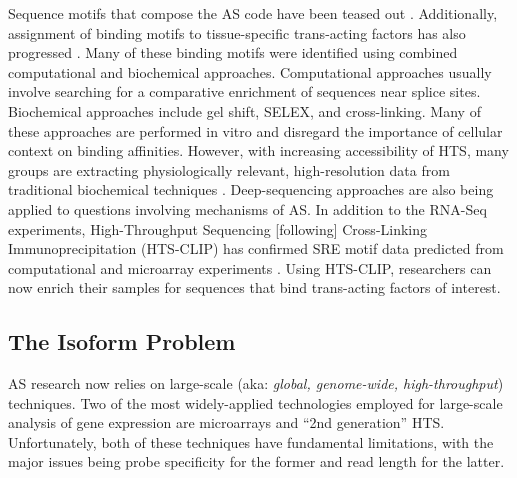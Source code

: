     Sequence motifs that compose the AS code have been teased out \citep{Ladd2002, Barash2010}. Additionally, assignment of binding motifs to tissue-specific trans-acting factors has also progressed \citep{Jin2003,Ule2005,Licatalosi2008}. Many of these binding motifs were identified using combined computational and biochemical approaches. Computational approaches usually involve searching for a comparative enrichment of sequences near splice sites. Biochemical approaches include gel shift, SELEX, and cross-linking. Many of these approaches are performed in vitro and disregard the importance of cellular context on binding affinities. However, with increasing accessibility of HTS, many groups are extracting physiologically relevant, high-resolution data from traditional biochemical techniques \citep{Ingolia2009, Ingolia2011}. Deep-sequencing approaches are also being applied to questions involving mechanisms of AS. In addition to the RNA-Seq experiments, High-Throughput Sequencing [following] Cross-Linking Immunoprecipitation (HTS-CLIP) has confirmed SRE motif data predicted from computational and microarray experiments \citep{Licatalosi2008,Hafner2010}. Using HTS-CLIP, researchers can now enrich their samples for sequences that bind trans-acting factors of interest. 

  \subsection{The Isoform Problem}\label{Intro:sec:Isoform Problem}

    AS research now relies on large-scale (aka: \textit{global, genome-wide, high-throughput}) techniques. Two of the most widely-applied technologies employed for large-scale analysis of gene expression are microarrays and ``2nd generation'' HTS. Unfortunately, both of these techniques have fundamental limitations, with the major issues being probe specificity for the former and read length for the latter.

